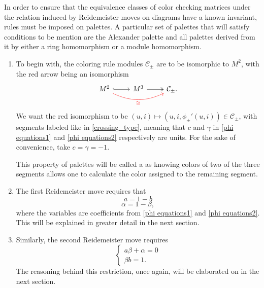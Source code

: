 In order to ensure that the equivalence classes of color checking matrices under the relation induced by Reidemeister moves on diagrams have a known invariant, rules must be imposed on palettes. A particular set of palettes that will satisfy conditions to be mention are the Alexander palette and all palettes derived from it by either a ring homomorphism or a module homomorphism.
\begin{enumerate}
  \item To begin with, the coloring rule modules $\mathcal{C}_\pm$ are to be isomorphic to $M^2$, with the red arrow being an isomorphism
    $$
    \begin{tikzcd}
      M^2 \arrow[r, hookrightarrow] \arrow[rr, bend right=25, red, "\cong" below] & M^3 \arrow[twoheadrightarrow, r] & \mathcal{C}_\pm.
    \end{tikzcd}
    $$
    We want the red isomorphism to be $(u, i)\mapsto (u, i, \phi_\pm'(u, i))\in\mathcal{C}_\pm$, with segments labeled like in \cref{crossing_type}, meaning that $c$ and $\gamma$ in \eqref{phi equations1} and \eqref{phi equations2} respectively are units. For the sake of convenience, take $c=\gamma=-1$.

    This property of palettes will be called a  as knowing colors of two of the three segments allows one to calculate the color assigned to the remaining segment.
  \item The first Reidemeister move requires that
    $$a=1-b$$
    $$\alpha=1-\beta,$$
    where the variables are coefficients from \eqref{phi equations1} and \eqref{phi equations2}. This will be explained in greater detail in the next section. 
  \item Similarly, the second Reidemeister move requires
    $$\begin{cases}
      a\beta+\alpha=0\\ 
      \beta b=1.
    \end{cases}$$
    The reasoning behind this restriction, once again, will be elaborated on in the next section.
\end{enumerate}








